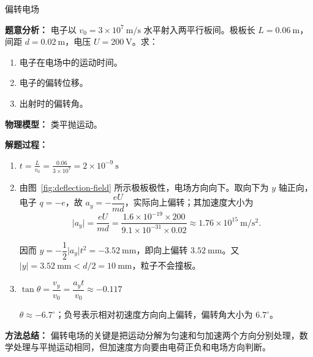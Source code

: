 \begin{examplebox}{偏转电场}

\textbf{题意分析：} 电子以 $v_0 = 3 \times 10^7\ \mathrm{m/s}$ 水平射入两平行板间。极板长 $L = 0.06\ \mathrm{m}$，间距 $d = 0.02\ \mathrm{m}$，电压 $U = 200\ \mathrm{V}$。求：
\begin{enumerate}
  \item 电子在电场中的运动时间。
  \item 电子的偏转位移。
  \item 出射时的偏转角。
\end{enumerate}

\textbf{物理模型：} 类平抛运动。

\textbf{解题过程：}

\begin{enumerate}
  \item $t = \frac{L}{v_0} = \frac{0.06}{3 \times 10^7} = 2 \times 10^{-9}\ \mathrm{s}$

  \item 由图~\ref{fig:deflection-field} 所示极板极性，电场方向向下。取向下为 $y$ 轴正向，电子 $q=-e$，故 $a_y=-\dfrac{eU}{md}$，实际向上偏转；其加速度大小为
  \[
  \lvert a_y\rvert = \frac{eU}{md} = \frac{1.6 \times 10^{-19} \times 200}{9.1 \times 10^{-31} \times 0.02} \approx 1.76 \times 10^{15}\ \mathrm{m/s^2}.
  \]

  因而 $y=-\dfrac12\lvert a_y\rvert t^2=-3.52\ \mathrm{mm}$，即向上偏转 $3.52\ \mathrm{mm}$。又 $\lvert y\rvert=3.52\ \mathrm{mm}<d/2=10\ \mathrm{mm}$，粒子不会撞板。

  \item $\tan\theta = \dfrac{v_y}{v_0} = \dfrac{a_yt}{v_0}\approx -0.117$

  $\theta \approx -6.7^\circ$；负号表示相对初速度方向向上偏转，偏转角大小为 $6.7^\circ$。
\end{enumerate}

\textbf{方法总结：} 偏转电场的关键是把运动分解为匀速和匀加速两个方向分别处理，数学处理与平抛运动相同，但加速度方向要由电荷正负和电场方向判断。

\end{examplebox}


